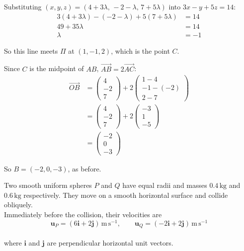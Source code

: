 \documentclass[leqno]{article}
\begin{document}
\begin{enumerate}[
  label=\textbf{\arabic*.},
  leftmargin=*,
  topsep=0pt,
  partopsep=0pt,
  parsep=0pt
]
\begin{djsSolution}
{Substituting \((x,y,z)=(4+3\lambda,\,-2-\lambda,\,7+5\lambda)\) into \(3x-y+5z=14\):
\begin{align*}
3(4+3\lambda)-(-2-\lambda)+5(7+5\lambda)&=14\\
49+35\lambda&=14\\
\lambda&=-1
\end{align*}

So this line meets \(\Pi\) at \((1,-1,2)\), which is the point \(C\).

Since \(C\) is the midpoint of \(AB\), \(\overrightarrow{AB}=2\overrightarrow{AC}\):
\begin{align*}
\overrightarrow{OB}
&=\begin{pmatrix}4\\-2\\7\end{pmatrix}+2\begin{pmatrix}1-4\\-1-(-2)\\2-7\end{pmatrix}\\
&=\begin{pmatrix}4\\-2\\7\end{pmatrix}+2\begin{pmatrix}-3\\1\\-5\end{pmatrix}\\
&=\begin{pmatrix}-2\\0\\-3\end{pmatrix}
\end{align*}

So \(B=(-2,0,-3)\), as before.
\par}
\end{djsSolution}

\newpage

\questionitem

Two smooth uniform spheres $P$ and $Q$ have equal radii and masses $0.4\,\mathrm{kg}$ and $0.6\,\mathrm{kg}$ respectively. They move on a smooth horizontal surface and collide obliquely. \\

Immediately before the collision, their velocities are
\[
\mathbf{u}_P=(6\mathbf{i}+2\mathbf{j})\,\mathrm{m\,s^{-1}},\qquad \mathbf{u}_Q=(-2\mathbf{i}+2\mathbf{j})\,\mathrm{m\,s^{-1}}
\] \\
where $\mathbf{i}$ and $\mathbf{j}$ are perpendicular horizontal unit vectors. \\


\end{enumerate}
\end{document}
